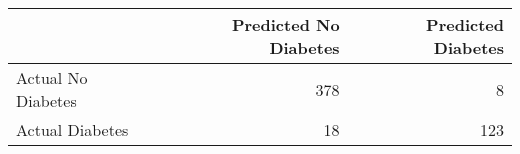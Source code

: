 \begin{tabular}{lrr}
\toprule
 & Predicted No Diabetes & Predicted Diabetes \\
\midrule
Actual No Diabetes & 378 & 8 \\
Actual Diabetes & 18 & 123 \\
\bottomrule
\end{tabular}
